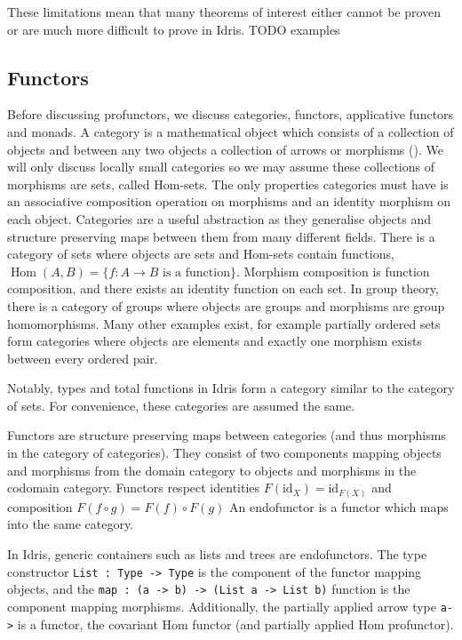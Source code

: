 \documentclass[]{report}
\begin{document}
These limitations mean that many theorems of interest either cannot be proven or are much more difficult to prove in Idris. TODO examples

\subsection{Functors}

Before discussing profunctors, we discuss categories, functors, applicative functors and monads. A category is a mathematical object which consists of a collection of objects and between any two objects a collection of arrows or morphisms (\cite{mac1970categories}). We will only discuss locally small categories so we may assume these collections of morphisms are sets, called Hom-sets. The only properties categories must have is an associative composition operation on morphisms and an identity morphism on each object. Categories are a useful abstraction as they generalise objects and structure preserving maps between them from many different fields. There is a category of sets where objects are sets and Hom-sets contain functions, $\operatorname{Hom}(A,B)=\{ f : A\to B\text{ is a function} \}$. Morphism composition is function composition, and there exists an identity function on each set. In group theory, there is a category of groups where objects are groups and morphisms are group homomorphisms. Many other examples exist, for example partially ordered sets form categories where objects are elements and exactly one morphism exists between every ordered pair.

Notably, types and total functions in Idris form a category similar to the category of sets. For convenience, these categories are assumed the same.

Functors are structure preserving maps between categories (and thus morphisms in the category of categories). They consist of two components mapping objects and morphisms from the domain category to objects and morphisms in the codomain category. Functors respect identities $F(\text{id}_X)=\text{id}_{F(X)}$ and composition $F(f\circ g)=F(f)\circ F(g)$ An endofunctor is a functor which maps into the same category.

In Idris, generic containers such as lists and trees are endofunctors. The type constructor \texttt{List : Type -> Type} is the component of the functor mapping objects, and the \texttt{map : (a -> b) -> (List a -> List b)} function is the component mapping morphisms. Additionally, the partially applied arrow type \texttt{a->} is a functor, the covariant Hom functor (and partially applied Hom profunctor).
\end{document}
